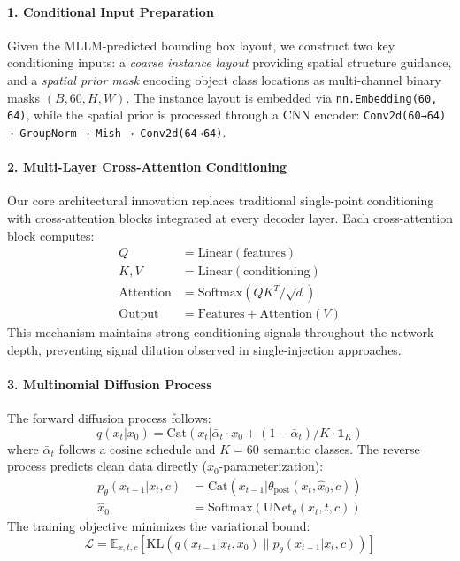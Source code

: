 \documentclass{article}
\begin{document}
\paragraph{1. Conditional Input Preparation}
Given the MLLM-predicted bounding box layout, we construct two key conditioning inputs: a \textit{coarse instance layout} providing spatial structure guidance, and a \textit{spatial prior mask} encoding object class locations as multi-channel binary masks $(B, 60, H, W)$. The instance layout is embedded via \texttt{nn.Embedding(60, 64)}, while the spatial prior is processed through a CNN encoder: \texttt{Conv2d(60→64) → GroupNorm → Mish → Conv2d(64→64)}.

\paragraph{2. Multi-Layer Cross-Attention Conditioning}
Our core architectural innovation replaces traditional single-point conditioning with cross-attention blocks integrated at every decoder layer. Each cross-attention block computes:
\begin{align}
Q &= \text{Linear}(\text{features}) \\
K, V &= \text{Linear}(\text{conditioning}) \\
\text{Attention} &= \text{Softmax}(QK^T/\sqrt{d}) \\
\text{Output} &= \text{Features} + \text{Attention}(V)
\end{align}
This mechanism maintains strong conditioning signals throughout the network depth, preventing signal dilution observed in single-injection approaches.

\paragraph{3. Multinomial Diffusion Process}
The forward diffusion process follows:
\begin{equation}
q(x_t | x_0) = \text{Cat}(x_t | \bar{\alpha}_t \cdot x_0 + (1 - \bar{\alpha}_t)/K \cdot \mathbf{1}_K)
\end{equation}
where $\bar{\alpha}_t$ follows a cosine schedule and $K=60$ semantic classes. The reverse process predicts clean data directly ($x_0$-parameterization):
\begin{align}
p_\theta(x_{t-1} | x_t, c) &= \text{Cat}(x_{t-1} | \theta_{\text{post}}(x_t, \hat{x}_0, c)) \\
\hat{x}_0 &= \text{Softmax}(\text{UNet}_\theta(x_t, t, c))
\end{align}
The training objective minimizes the variational bound:
\begin{equation}
\mathcal{L} = \mathbb{E}_{x,t,c}[\text{KL}(q(x_{t-1}|x_t,x_0) \| p_\theta(x_{t-1}|x_t,c))]
\end{equation}
\end{document}
